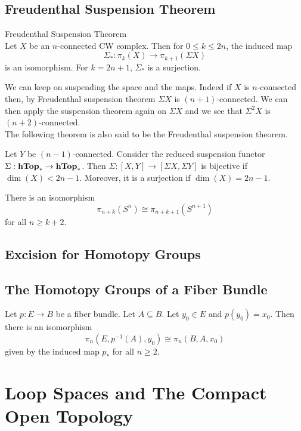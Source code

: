 \documentclass[a4paper]{article}
\begin{document}
\subsection{Freudenthal Suspension Theorem}
\begin{thm}{Freudenthal Suspension Theorem}{}\\
Let $X$ be an $n$-connected CW complex. Then for $0\leq k\leq 2n$, the induced map $$\Sigma_\ast:\pi_k(X)\to\pi_{k+1}(\Sigma X)$$ is an isomorphism. For $k=2n+1$, $\Sigma_\ast$ is a surjection. 
\end{thm}

We can keep on suspending the space and the maps. Indeed if $X$ is $n$-connected then, by Freudenthal suspension theorem $\Sigma X$ is $(n+1)$-connected. We can then apply the suspension theorem again on $\Sigma X$ and we see that $\Sigma^2X$ is $(n+2)$-connected. \\

The following theorem is also said to be the Freudenthal suspension theorem. 

\begin{thm}{}{} Let $Y$ be $(n-1)$-connected. Consider the reduced suspension functor $\Sigma:\bold{hTop}_\ast\to\bold{hTop}_\ast$. Then $\Sigma:[X,Y]\to[\Sigma X,\Sigma Y]$ is bijective if $\dim(X)<2n-1$. Moreover, it is a surjection if $\dim(X)=2n-1$. 
\end{thm}

\begin{crl}{}{} There is an isomorphism $$\pi_{n+k}(S^n)\cong\pi_{n+k+1}(S^{n+1})$$ for all $n\geq k+2$. 
\end{crl}

\subsection{Excision for Homotopy Groups}

\subsection{The Homotopy Groups of a Fiber Bundle}
\begin{thm}{}{} Let $p:E\to B$ be a fiber bundle. Let $A\subseteq B$. Let $y_0\in E$ and $p(y_0)=x_0$. Then there is an isomorphism $$\pi_n(E,p^{-1}(A),y_0)\cong\pi_n(B,A,x_0)$$ given by the induced map $p_\ast$ for all $n\geq 2$. 
\end{thm}

\pagebreak
\section{Loop Spaces and The Compact Open Topology}
\end{document}
